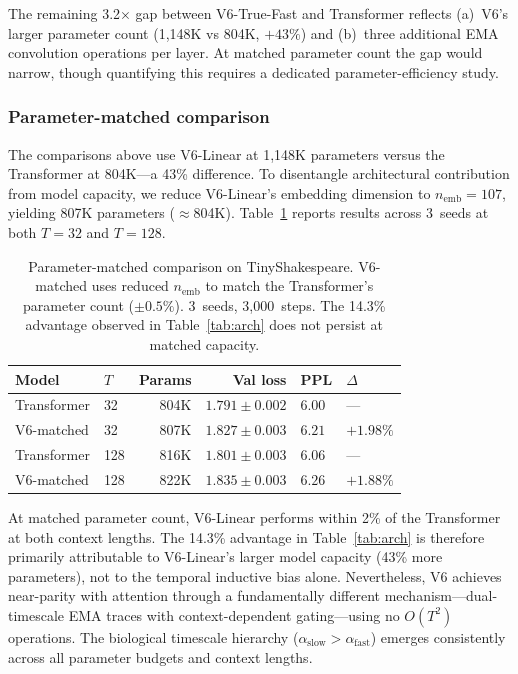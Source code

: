 \documentclass[11pt,a4paper]{article}
\begin{document}
The remaining 3.2$\times$ gap between V6-True-Fast and Transformer reflects
(a)~V6's larger parameter count (1,148K vs 804K, $+43\%$) and
(b)~three additional EMA convolution operations per layer.
At matched parameter count the gap would narrow, though quantifying this
requires a dedicated parameter-efficiency study.

\subsubsection{Parameter-matched comparison}
\label{sec:param_matched}

The comparisons above use V6-Linear at 1{,}148K parameters versus the
Transformer at 804K---a 43\% difference. To disentangle
architectural contribution from model capacity,
we reduce V6-Linear's embedding dimension to $n_\mathrm{emb}=107$,
yielding 807K parameters ($\approx$804K).
Table~\ref{tab:param_matched} reports results across 3~seeds
at both $T=32$ and $T=128$.

\begin{table}[t]
\centering
\caption{%
Parameter-matched comparison on TinyShakespeare.
V6-matched uses reduced $n_\mathrm{emb}$ to match the Transformer's parameter
count ($\pm 0.5\%$). 3~seeds, 3,000~steps. The 14.3\% advantage
observed in Table~\ref{tab:arch} does not persist at matched capacity.%
}
\label{tab:param_matched}
\begin{tabular}{@{}llrrll@{}}
\toprule
Model & $T$ & Params & Val loss & PPL & $\Delta$ \\
\midrule
Transformer        & 32  & 804K & $1.791\pm0.002$ & $6.00$ & --- \\
V6-matched         & 32  & 807K & $1.827\pm0.003$ & $6.21$ & $+1.98\%$ \\
\midrule
Transformer        & 128 & 816K & $1.801\pm0.003$ & $6.06$ & --- \\
V6-matched         & 128 & 822K & $1.835\pm0.003$ & $6.26$ & $+1.88\%$ \\
\bottomrule
\end{tabular}
\end{table}

At matched parameter count, V6-Linear performs within 2\% of the
Transformer at both context lengths. The 14.3\% advantage in
Table~\ref{tab:arch} is therefore primarily attributable to V6-Linear's
larger model capacity (43\% more parameters), not to the temporal
inductive bias alone. Nevertheless, V6 achieves near-parity with
attention through a fundamentally different mechanism---dual-timescale
EMA traces with context-dependent gating---using no $O(T^2)$ operations.
The biological timescale hierarchy ($\alpha_\mathrm{slow} >
\alpha_\mathrm{fast}$) emerges consistently across all parameter
budgets and context lengths.
\end{document}
